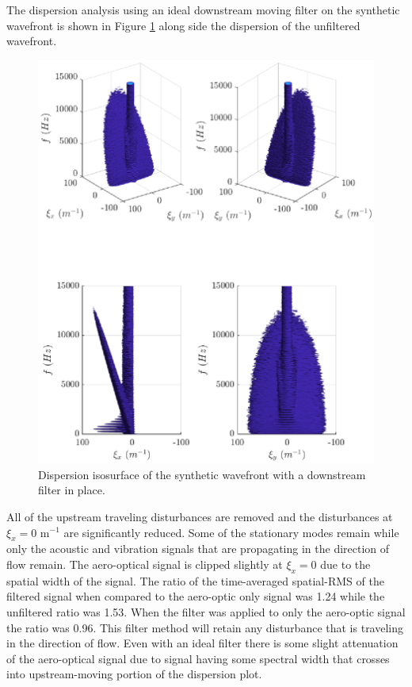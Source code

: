 The dispersion analysis using an ideal downstream moving filter on the synthetic wavefront is shown in Figure \ref{fig:04_filter_downstream} along side the dispersion of the unfiltered wavefront.
\begin{figure}
 \centering
 \includegraphics{../matlab/04_basic_filtering/filter_downstream.eps}
 \caption{Dispersion isosurface of the synthetic wavefront with a downstream filter in place.}
 \label{fig:04_filter_downstream}
\end{figure}
All of the upstream traveling disturbances are removed and the disturbances at $\xi_x=0$ m$^{-1}$ are significantly reduced.
Some of the stationary modes remain while only the acoustic and vibration signals that are propagating in the direction of flow remain.
The aero-optical signal is clipped slightly at $\xi_x=0$ due to the spatial width of the signal.
The ratio of the time-averaged spatial-RMS of the filtered signal when compared to the aero-optic only signal was 1.24 while the unfiltered ratio was 1.53.
When the filter was applied to only the aero-optic signal the ratio was 0.96.
This filter method will retain any disturbance that is traveling in the direction of flow.
Even with an ideal filter there is some slight attenuation of the aero-optical signal due to signal having some spectral width that crosses into upstream-moving portion of the dispersion plot.


